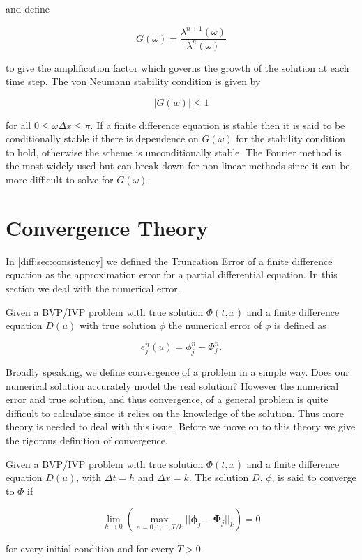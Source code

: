 \documentclass[../main.tex]{subfiles}
\begin{document}
  and define

  \begin{equation}
    G(\omega) = \frac{\lambda^{n+1}(\omega)}{\lambda^n(\omega)}
  \end{equation}

  to give the amplification factor which governs the growth of the solution at each time step. The von Neumann stability condition is given by

  \begin{equation}
    \left\vert G(w) \right\vert \leq 1
  \end{equation}

  for all $0 \leq \omega \Delta x \leq \pi$. If a finite difference equation is stable then it is said to be conditionally stable if there is dependence on $G(\omega)$ for the stability condition to hold, otherwise the scheme is unconditionally stable. The Fourier method is the most widely used but can break down for non-linear methods since it can be more difficult to solve for $G(\omega)$.

  \section{Convergence Theory}
  In \autoref{diff:sec:consistency} we defined the Truncation Error of a finite difference equation as the approximation error for a partial differential equation. In this section we deal with the numerical error.

  \begin{definition}
    Given a BVP/IVP problem with true solution $\Phi(t, x)$ and a finite difference equation $D(u)$ with true solution $\phi$ the numerical error of $\phi$ is defined as

    \begin{equation}
      e^n_j(u) = \phi^n_j - \Phi^n_j.
    \end{equation}
  \end{definition}

  Broadly speaking, we define convergence of a problem in a simple way. Does our numerical solution accurately model the real solution? However the numerical error and true solution, and thus convergence, of a general problem is quite difficult to calculate since it relies on the knowledge of the solution. Thus more theory is needed to deal with this issue. Before we move on to this theory we give the rigorous definition of convergence.

  \begin{definition}[Convergence]
    Given a BVP/IVP problem with true solution $\Phi(t, x)$ and a finite difference equation $D(u)$, with $\Delta t = h$ and $\Delta x = k$. The solution $D$, $\phi$, is said to converge to $\Phi$ if

    \begin{equation}
      \lim_{k \to 0} \left( \max_{n = 0, 1, ..., T / k} || \boldsymbol\phi_j - \boldsymbol\Phi_j ||_k \right) = 0
    \end{equation}

    for every initial condition and for every $T > 0$.
  \end{definition}
\end{document}
